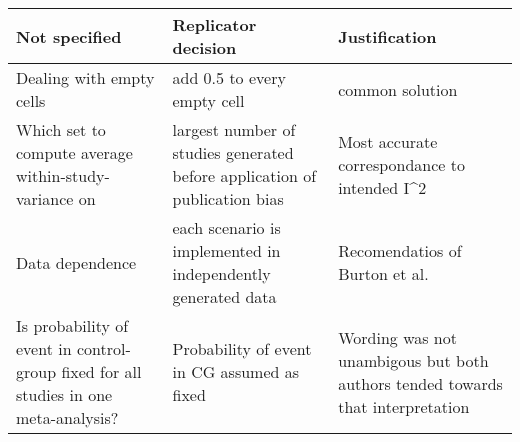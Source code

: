\documentclass[english,doc,floatsintext]{apa6}
\begin{document}
\begin{longtable}[]{@{}lll@{}}
\toprule
\begin{minipage}[b]{0.32\columnwidth}\raggedright
Not specified\strut
\end{minipage} & \begin{minipage}[b]{0.44\columnwidth}\raggedright
Replicator decision\strut
\end{minipage} & \begin{minipage}[b]{0.16\columnwidth}\raggedright
Justification\strut
\end{minipage}\tabularnewline
\midrule
\endhead
\begin{minipage}[t]{0.32\columnwidth}\raggedright
Dealing with empty cells\strut
\end{minipage} & \begin{minipage}[t]{0.44\columnwidth}\raggedright
add 0.5 to every empty cell\strut
\end{minipage} & \begin{minipage}[t]{0.16\columnwidth}\raggedright
common solution\strut
\end{minipage}\tabularnewline
\begin{minipage}[t]{0.32\columnwidth}\raggedright
Which set to compute average within-study-variance on\strut
\end{minipage} & \begin{minipage}[t]{0.44\columnwidth}\raggedright
largest number of studies generated before application of publication bias\strut
\end{minipage} & \begin{minipage}[t]{0.16\columnwidth}\raggedright
Most accurate correspondance to intended I\^{}2\strut
\end{minipage}\tabularnewline
\begin{minipage}[t]{0.32\columnwidth}\raggedright
Data dependence\strut
\end{minipage} & \begin{minipage}[t]{0.44\columnwidth}\raggedright
each scenario is implemented in independently generated data\strut
\end{minipage} & \begin{minipage}[t]{0.16\columnwidth}\raggedright
Recomendatios of Burton et al.\strut
\end{minipage}\tabularnewline
\begin{minipage}[t]{0.32\columnwidth}\raggedright
Is probability of event in control-group fixed for all studies in one meta-analysis?\strut
\end{minipage} & \begin{minipage}[t]{0.44\columnwidth}\raggedright
Probability of event in CG assumed as fixed\strut
\end{minipage} & \begin{minipage}[t]{0.16\columnwidth}\raggedright
Wording was not unambigous but both authors tended towards that interpretation\strut
\end{minipage}\tabularnewline
\bottomrule
\end{longtable}
\end{document}
